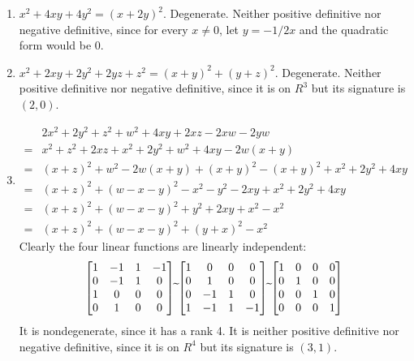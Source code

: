 \documentclass{homework}
\begin{document}
\begin{problem}{6}
\begin{enumerate}
\item $x^2+4xy+4y^2 = (x+2y)^2$. Degenerate. Neither positive definitive nor
negative definitive, since for every $x \neq 0$, let $y = -1/2x$ and the
quadratic form would be 0.

\item $x^2+2xy+2y^2+2yz+z^2=(x+y)^2+(y+z)^2$. Degenerate. Neither positive
definitive nor negative definitive, since it is on $R^3$ but its signature
is $(2, 0)$.

\item
\begin{align*}
  & 2x^2+2y^2+z^2+w^2+4xy+2xz-2xw-2yw \\
= & x^2+z^2+2xz + x^2+2y^2+w^2+4xy-2w(x+y) \\
= & (x+z)^2 + w^2-2w(x+y)+(x+y)^2 - (x+y)^2 + x^2+2y^2+4xy \\
= & (x+z)^2+(w-x-y)^2 - x^2-y^2-2xy + x^2+2y^2+4xy \\
= & (x+z)^2+(w-x-y)^2 + y^2+2xy+x^2 - x^2 \\
= & (x+z)^2+(w-x-y)^2 + (y+x)^2 -x^2
\end{align*}
Clearly the four linear functions are linearly independent:
$$\begin{bmatrix}1&-1&1&-1\\0&-1&1&0\\1&0&0&0\\0&1&0&0\end{bmatrix} \widetilde{}
\begin{bmatrix}1&0&0&0\\0&1&0&0\\0&-1&1&0\\1&-1&1&-1\end{bmatrix} \widetilde{}
\begin{bmatrix}1&0&0&0\\0&1&0&0\\0&0&1&0\\0&0&0&1\end{bmatrix}$$
It is nondegenerate, since it has a rank 4. It is neither positive definitive
nor negative definitive, since it is on $R^4$ but its signature is $(3,1)$.
\end{enumerate}
\end{problem}
\end{document}
